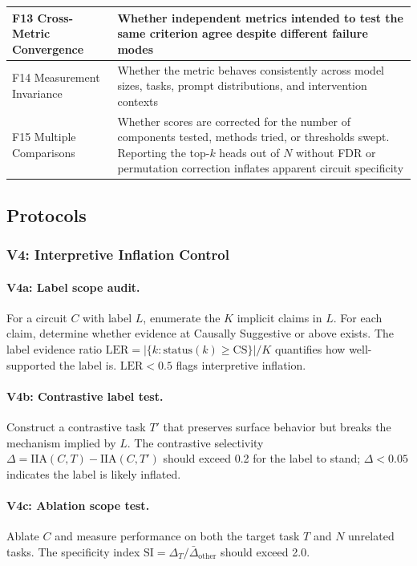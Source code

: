 \documentclass{article}
\begin{document}
\begin{minipage}{\linewidth}
\begin{center}
\begin{tabular}{@{}lp{10cm}@{}}
\midrule
F13 Cross-Metric Convergence & Whether independent metrics intended to test the same criterion agree despite different failure modes \\
\midrule
F14 Measurement Invariance & Whether the metric behaves consistently across model sizes, tasks, prompt distributions, and intervention contexts \\
\midrule
F15 Multiple Comparisons & Whether scores are corrected for the number of components tested, methods tried, or thresholds swept. Reporting the top-$k$ heads out of $N$ without FDR or permutation correction inflates apparent circuit specificity \\
\bottomrule
\end{tabular}
\end{center}
\end{minipage}

\endgroup

\subsection{Protocols}
\label{appendix:protocols}

\subsubsection{V4: Interpretive Inflation Control}

\paragraph{V4a: Label scope audit.} For a circuit $C$ with label $L$, enumerate the $K$ implicit claims in $L$. For each claim, determine whether evidence at Causally Suggestive or above exists. The label evidence ratio $\text{LER} = |\{k : \text{status}(k) \geq \text{CS}\}| / K$ quantifies how well-supported the label is. $\text{LER} < 0.5$ flags interpretive inflation.

\paragraph{V4b: Contrastive label test.} Construct a contrastive task $T'$ that preserves surface behavior but breaks the mechanism implied by $L$. The contrastive selectivity $\Delta = \text{IIA}(C, T) - \text{IIA}(C, T')$ should exceed 0.2 for the label to stand; $\Delta < 0.05$ indicates the label is likely inflated.

\paragraph{V4c: Ablation scope test.} Ablate $C$ and measure performance on both the target task $T$ and $N$ unrelated tasks. The specificity index $\text{SI} = \Delta_T / \bar{\Delta}_{\text{other}}$ should exceed 2.0.
\end{document}
